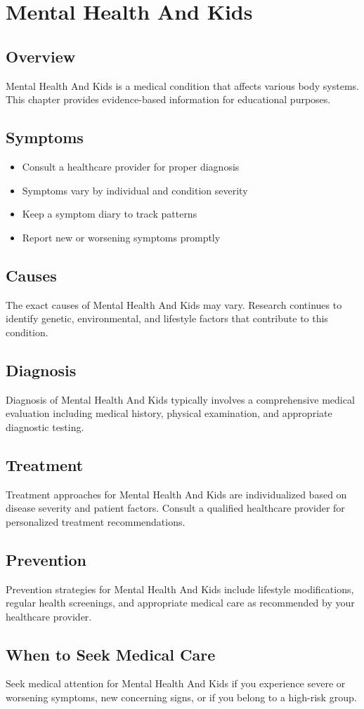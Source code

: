 \chapter{Mental Health And Kids}

\section*{Overview}
Mental Health And Kids is a medical condition that affects various body systems. This chapter provides evidence-based information for educational purposes.

\section*{Symptoms}
\begin{itemize}
  \item Consult a healthcare provider for proper diagnosis
  \item Symptoms vary by individual and condition severity
  \item Keep a symptom diary to track patterns
  \item Report new or worsening symptoms promptly
\end{itemize}

\section*{Causes}
The exact causes of Mental Health And Kids may vary. Research continues to identify genetic, environmental, and lifestyle factors that contribute to this condition.

\section*{Diagnosis}
Diagnosis of Mental Health And Kids typically involves a comprehensive medical evaluation including medical history, physical examination, and appropriate diagnostic testing.

\section*{Treatment}
Treatment approaches for Mental Health And Kids are individualized based on disease severity and patient factors. Consult a qualified healthcare provider for personalized treatment recommendations.

\section*{Prevention}
Prevention strategies for Mental Health And Kids include lifestyle modifications, regular health screenings, and appropriate medical care as recommended by your healthcare provider.

\section*{When to Seek Medical Care}
Seek medical attention for Mental Health And Kids if you experience severe or worsening symptoms, new concerning signs, or if you belong to a high-risk group.
\clearpage
